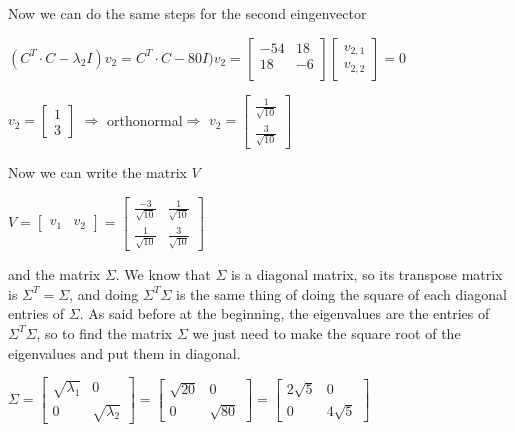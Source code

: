 Now we can do the same steps for the second eingenvector
\begin{center}
		$  (C^T \cdot C-\lambda_2 I)v_2= C^T \cdot C-80 I) v_2= \begin{bmatrix}
		-54 &   18 \\
		18  &  -6\\
	\end{bmatrix}\begin{bmatrix}v_{2,1}\\v_{2,2}\end{bmatrix}=0  $
\end{center}

\begin{center}
	$  v_2=\begin{bmatrix}
	1\\
	3
	\end{bmatrix}$ $ \Longrightarrow $ orthonormal$ \Longrightarrow $ $v_2=\begin{bmatrix}
	\frac{1}{\sqrt{10}}\\
	\frac{3}{\sqrt{10}}
	\end{bmatrix}  $
\end{center}
Now we can write the matrix $ V $
\begin{center}
	$ V=\begin{bmatrix}
	v_1 & v_2
	\end{bmatrix}=\begin{bmatrix}
	\frac{-3}{\sqrt{10}} & \frac{1}{\sqrt{10}}\\
	\frac{1}{\sqrt{10}} &	\frac{3}{\sqrt{10}}
	\end{bmatrix} $
\end{center}
and the matrix $ \Sigma $. We know that  $ \Sigma $ is a diagonal matrix, so its transpose matrix is $ \Sigma^T= \Sigma  $, and doing $\Sigma^T \Sigma$ is the same thing of doing the square of each diagonal entries of $\Sigma$.
As said before at the beginning, the eigenvalues are the entries of $\Sigma^T \Sigma$, so to find the matrix $\Sigma$ we just need to make the square root of the eigenvalues and put them in diagonal.
\begin{center}
	$ \Sigma=\begin{bmatrix}
	\sqrt{\lambda_1} & 0\\
	0 & \sqrt{\lambda_2}
	\end{bmatrix}=\begin{bmatrix}
		\sqrt{20} & 0\\
		0 & \sqrt{80}
	\end{bmatrix}=\begin{bmatrix}
	2\sqrt{5} & 0\\
	0 & 4\sqrt{5}
	\end{bmatrix} $
\end{center}
